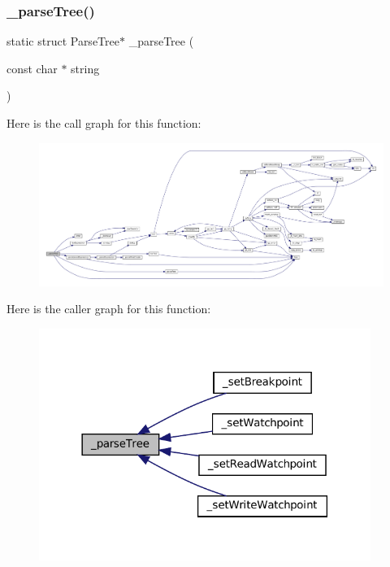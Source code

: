 \subsubsection{\texorpdfstring{\+\_\+parse\+Tree()}{\_parseTree()}}
{\footnotesize\ttfamily static struct Parse\+Tree$\ast$ \+\_\+parse\+Tree (\begin{DoxyParamCaption}\item[{const char $\ast$}]{string }\end{DoxyParamCaption})\hspace{0.3cm}{\ttfamily [static]}}

Here is the call graph for this function\+:
\nopagebreak
\begin{figure}[H]
\begin{center}
\leavevmode
\includegraphics[width=350pt]{debugger_2cli-debugger_8c_a27934628b83d6ccd96e46e1765075a98_cgraph}
\end{center}
\end{figure}
Here is the caller graph for this function\+:
\nopagebreak
\begin{figure}[H]
\begin{center}
\leavevmode
\includegraphics[width=306pt]{debugger_2cli-debugger_8c_a27934628b83d6ccd96e46e1765075a98_icgraph}
\end{center}
\end{figure}
\mbox{\label{debugger_2cli-debugger_8c_a87cc8a3ae9b66a7eb6ca4c6564140b39}} 

